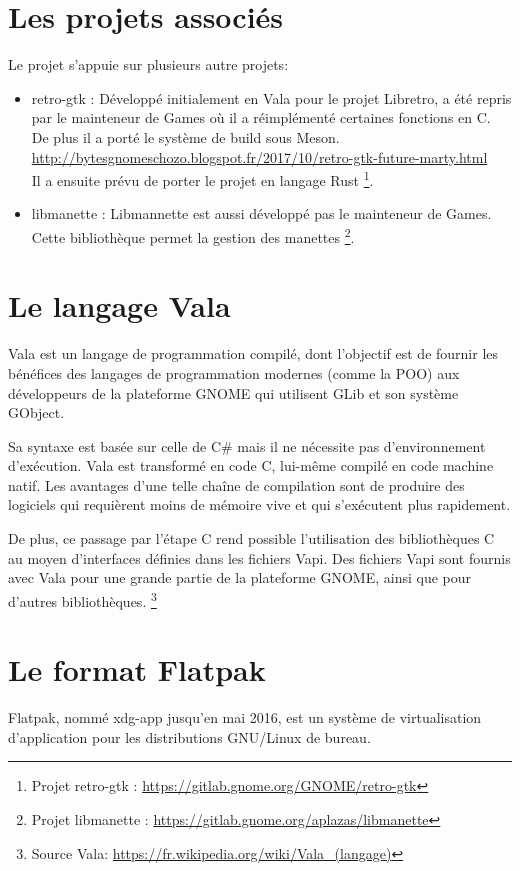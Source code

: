 \documentclass[12pt]{report}
\begin{document}
\section{Les projets associés}
Le projet s'appuie sur plusieurs autre projets:
\begin{itemize}
\item retro-gtk : Développé initialement en Vala pour le projet Libretro, a
  été repris par le mainteneur de Games où il a réimplémenté certaines
  fonctions en C. De plus il a porté le système de build sous Meson.\\
  \url{http://bytesgnomeschozo.blogspot.fr/2017/10/retro-gtk-future-marty.html}\\
  Il a ensuite prévu de porter le projet en langage Rust
  \footnote{Projet retro-gtk : \url{https://gitlab.gnome.org/GNOME/retro-gtk}}.
\item libmanette : Libmannette est aussi développé pas le mainteneur de Games. Cette bibliothèque
  permet la gestion des manettes
  \footnote{Projet libmanette : \url{https://gitlab.gnome.org/aplazas/libmanette}}.
\end{itemize}

\section{Le langage Vala}
Vala est un langage de programmation compilé, dont l'objectif est de
fournir les bénéfices des langages de programmation modernes (comme la
POO) aux développeurs de la plateforme GNOME qui utilisent GLib et son
système GObject.

Sa syntaxe est basée sur celle de C\# mais il ne nécessite pas
d'environnement d'exécution. Vala est transformé en code C, lui-même
compilé en code machine natif. Les avantages d'une telle chaîne de
compilation sont de produire des logiciels qui requièrent moins de
mémoire vive et qui s'exécutent plus rapidement.

De plus, ce passage par l'étape C rend possible l'utilisation des
bibliothèques C au moyen d'interfaces définies dans les fichiers
Vapi. Des fichiers Vapi sont fournis avec Vala pour une grande partie
de la plateforme GNOME, ainsi que pour d'autres bibliothèques.
\footnote{Source Vala: \url{https://fr.wikipedia.org/wiki/Vala_(langage)}}

\section{Le format Flatpak}
Flatpak, nommé xdg-app jusqu’en mai 2016, est un système de
virtualisation d’application pour les distributions GNU/Linux de
bureau.
\end{document}
